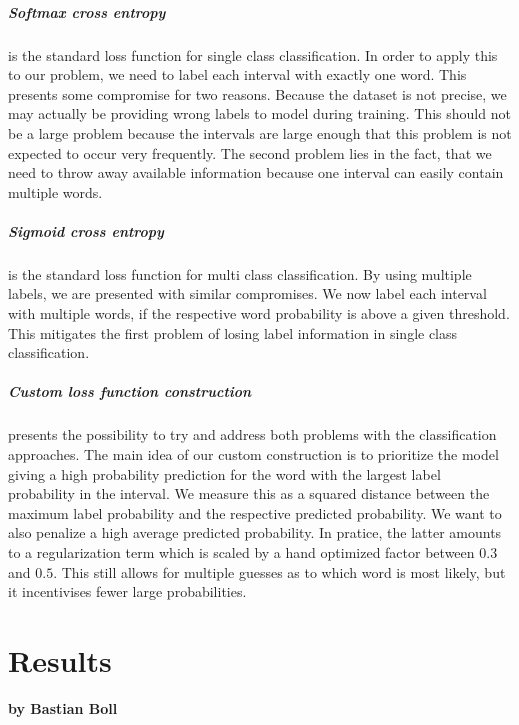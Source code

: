 \paragraph{Softmax cross entropy} is the standard loss function for single class classification. In order to apply this to our problem, we need to label each interval with exactly one word. This presents some compromise for two reasons. Because the dataset is not precise, we may actually be providing wrong labels to model during training. This should not be a large problem because the intervals are large enough that this problem is not expected to occur very frequently. The second problem lies in the fact, that we need to throw away available information because one interval can easily contain multiple words.

\paragraph{Sigmoid cross entropy} is the standard loss function for multi class classification. By using multiple labels, we are presented with similar compromises. We now label each interval with multiple words, if the respective word probability is above a given threshold. This mitigates the first problem of losing label information in single class classification.

\paragraph{Custom loss function construction} presents the possibility to try and address both problems with the classification approaches. The main idea of our custom construction is to prioritize the model giving a high probability prediction for the word with the largest label probability in the interval. We measure this as a squared distance between the maximum label probability and the respective predicted probability. We want to also penalize a high average predicted probability. In pratice, the latter amounts to a regularization term which is scaled by a hand optimized factor between $0.3$ and $0.5$. 
This still allows for multiple guesses as to which word is most likely, but it incentivises fewer large probabilities.

\chapter{Results}
\label{results}

\textbf{by Bastian Boll} \\

